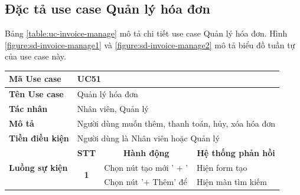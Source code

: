 \documentclass[../DoAn.tex]{subfiles}
\begin{document}
\subsection{Đặc tả use case Quản lý hóa đơn}
\label{section:uc-invoice-manage}
Bảng \ref{table:uc-invoice-manage} mô tả chi tiết use case Quản lý hóa đơn. Hình \ref{figure:sd-invoice-manage1} và \ref{figure:sd-invoice-manage2} mô tả biểu đồ tuần tự của use case này.
\begin{table}[H]
    \begin{tabular}{|l|c|l|l|}
        \hline
        \textbf{Mã Use case}                     & \multicolumn{3}{l|}{UC51}                                                                                                                                             \\ \hline
        \textbf{Tên Use case}                    & \multicolumn{3}{l|}{Quản lý hóa đơn}                                                                                                                                  \\ \hline
        \textbf{Tác nhân}                        & \multicolumn{3}{l|}{Nhân viên, Quản lý}                                                                                                                               \\ \hline
        \textbf{Mô tả}                           & \multicolumn{3}{l|}{Người dùng muốn thêm, thanh toán, hủy, xóa hóa đơn}                                                                                               \\ \hline
        \textbf{Tiền điều kiện}                  & \multicolumn{3}{l|}{Người dùng là Nhân viên hoặc Quản lý}                                                                                                             \\ \hline
        \multirow{21}{*}{\textbf{Luồng sự kiện}} & \multicolumn{1}{c|}{\textbf{STT}}                                       & \multicolumn{1}{c|}{\textbf{Hành động}}   & \multicolumn{1}{c|}{\textbf{Hệ thống phản hồi}} \\ \cline{2-4}
                                                 & \multirow{15}{*}{\textbf{1}}                                            & Chọn nút tạo mới ' + '                    & Hiện form tạo                                   \\ \cline{3-4}
                                                 &                                                                         & Chọn nút '+ Thêm' để                      & Hiện màn tìm kiếm                               \\

\end{tabular}
\end{table}
\end{document}
